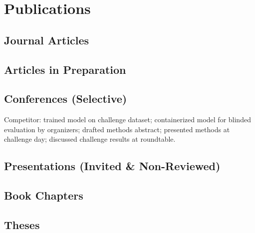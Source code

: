 \section{Publications}\twodate
\subsection{Journal Articles}
\subsection{Articles in Preparation}
\subsection{Conferences (Selective)}
{\bibfont* Competitor:
  trained model on challenge dataset;
  containerized model for blinded evaluation by organizers;
  drafted methods abstract;
  presented methods at challenge day;
  discussed challenge results at roundtable.}
  \subsection{Presentations (Invited \& Non-Reviewed)}
\subsection{Book Chapters}
\subsection{Theses}
